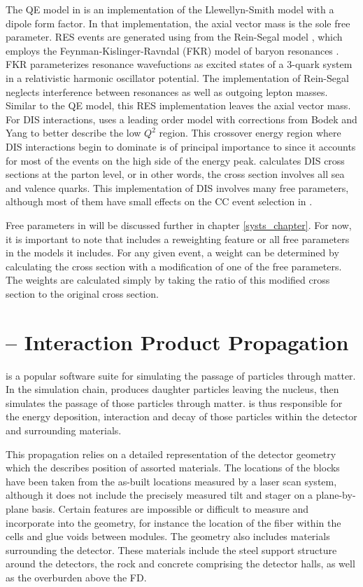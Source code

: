 The QE model in \genie is an implementation of the Llewellyn-Smith model \cite{LlewellynSmith} with a dipole form factor.  In that implementation, the axial vector mass is the sole free parameter.  RES events are generated using from the Rein-Segal model \cite{rein1981neutrino}, which employs the Feynman-Kislinger-Ravndal (FKR) model of baryon resonances \cite{feynman1971current}.  FKR parameterizes resonance wavefuctions as excited states of a 3-quark system in a relativistic harmonic oscillator potential.  The \genie implementation of Rein-Segal neglects interference between resonances as well as outgoing lepton masses.  Similar to the QE model, this RES implementation leaves the axial vector mass.  For DIS interactions, \genie uses a leading order model with corrections from Bodek and Yang \cite{bodek2003higher} to better describe the low $Q^2$ region.  This crossover energy region where DIS interactions begin to dominate is of principal importance to \nova since it accounts for most of the events on the high side of the energy peak.  \genie calculates DIS cross sections at the parton level, or in other words, the cross section involves all sea and valence quarks.  This implementation of DIS involves many free parameters, although most of them have small effects on the \numu CC event selection in \nova.

Free parameters in \genie will be discussed further in chapter \ref{systs_chapter}.  For now, it is important to note that \genie includes a reweighting feature or all free parameters in the models it includes.  For any given event, a weight can be determined by calculating the cross section with a modification of one of the free parameters.  The weights are calculated simply by taking the ratio of this modified cross section to the original cross section.


\section{\geant -- Interaction Product Propagation}
\label{geant_section}
\geant \cite{geant} is a popular software suite for simulating the passage of
particles through matter.  In the \nova simulation chain, \genie produces
daughter particles leaving the nucleus, then \geant simulates the passage of
those particles through matter.  \geant is thus responsible for the energy
deposition, interaction and decay of those particles within the detector and
surrounding materials.

This propagation relies on a detailed representation of the detector geometry which the describes position of assorted materials.
The locations of the blocks have been taken from the as-built locations measured by a laser scan system, although it does not include the precisely measured tilt and stager on a plane-by-plane basis.
Certain features are impossible or difficult to measure and incorporate into
the geometry, for instance the location of the fiber within the cells and glue voids between modules.  The geometry also includes materials surrounding the detector.  These materials include the steel support structure around the detectors, the rock and concrete comprising the detector halls, as well as the overburden above the FD.

